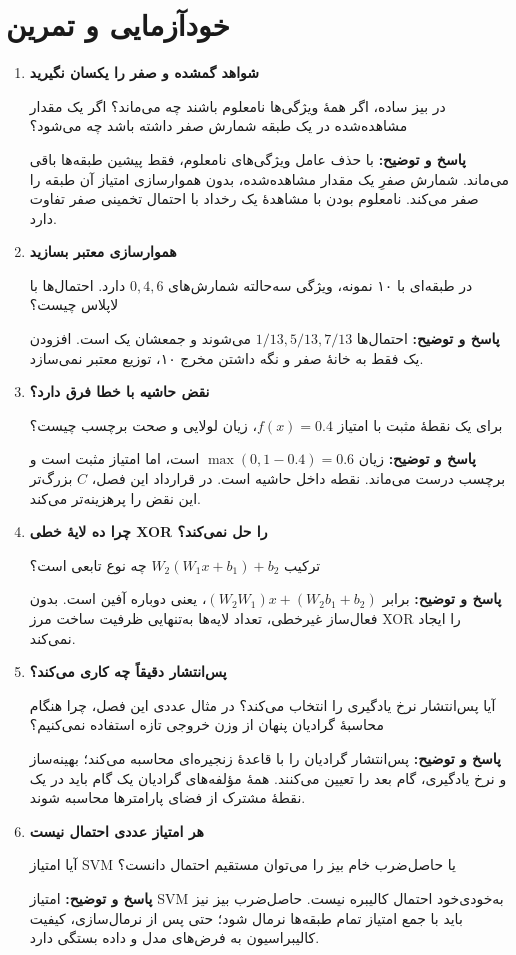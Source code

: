 \documentclass[12pt,a4paper,oneside]{report}
\newcounter{ex}[chapter]
\newenvironment{selftests}{\begin{enumerate}\setlength{\itemsep}{9pt}}{\end{enumerate}}
\newenvironment{selftest}[1]{\item\textbf{#1}\par}{\par}
\newcommand{\answer}[1]{\par{\color{teal}\bfseries پاسخ و توضیح: }#1\par}
\begin{document}
\section{خودآزمایی و تمرین}
\begin{selftests}
\begin{selftest}{شواهد گمشده و صفر را یکسان نگیرید}
در بیز ساده، اگر همهٔ ویژگی‌ها نامعلوم باشند چه می‌ماند؟ اگر یک مقدار مشاهده‌شده در یک طبقه شمارش صفر داشته باشد چه می‌شود؟
\answer{با حذف عامل ویژگی‌های نامعلوم، فقط پیشین طبقه‌ها باقی می‌ماند. شمارش صفرِ یک مقدار مشاهده‌شده، بدون هموارسازی امتیاز آن طبقه را صفر می‌کند. نامعلوم بودن با مشاهدهٔ یک رخداد با احتمال تخمینی صفر تفاوت دارد.}
\end{selftest}
\begin{selftest}{هموارسازی معتبر بسازید}
در طبقه‌ای با ۱۰ نمونه، ویژگی سه‌حالته شمارش‌های $0,4,6$ دارد. احتمال‌ها با لاپلاس چیست؟
\answer{احتمال‌ها $1/13,5/13,7/13$ می‌شوند و جمعشان یک است. افزودن یک فقط به خانهٔ صفر و نگه داشتن مخرج ۱۰، توزیع معتبر نمی‌سازد.}
\end{selftest}
\begin{selftest}{نقض حاشیه با خطا فرق دارد؟}
برای یک نقطهٔ مثبت با امتیاز $f(x)=0.4$، زیان لولایی و صحت برچسب چیست؟
\answer{زیان $\max(0,1-0.4)=0.6$ است، اما امتیاز مثبت است و برچسب درست می‌ماند. نقطه داخل حاشیه است. در قرارداد این فصل، $C$ بزرگ‌تر این نقض را پرهزینه‌تر می‌کند.}
\end{selftest}
\begin{selftest}{چرا ده لایهٔ خطی XOR را حل نمی‌کند؟}
ترکیب $W_2(W_1x+b_1)+b_2$ چه نوع تابعی است؟
\answer{برابر $(W_2W_1)x+(W_2b_1+b_2)$، یعنی دوباره آفین است. بدون فعال‌ساز غیرخطی، تعداد لایه‌ها به‌تنهایی ظرفیت ساخت مرز XOR را ایجاد نمی‌کند.}
\end{selftest}
\begin{selftest}{پس‌انتشار دقیقاً چه کاری می‌کند؟}
آیا پس‌انتشار نرخ یادگیری را انتخاب می‌کند؟ در مثال عددی این فصل، چرا هنگام محاسبهٔ گرادیان پنهان از وزن خروجی تازه استفاده نمی‌کنیم؟
\answer{پس‌انتشار گرادیان را با قاعدهٔ زنجیره‌ای محاسبه می‌کند؛ بهینه‌ساز و نرخ یادگیری، گام بعد را تعیین می‌کنند. همهٔ مؤلفه‌های گرادیان یک گام باید در یک نقطهٔ مشترک از فضای پارامترها محاسبه شوند.}
\end{selftest}
\begin{selftest}{هر امتیاز عددی احتمال نیست}
آیا امتیاز SVM یا حاصل‌ضرب خام بیز را می‌توان مستقیم احتمال دانست؟
\answer{امتیاز SVM به‌خودی‌خود احتمال کالیبره نیست. حاصل‌ضرب بیز نیز باید با جمع امتیاز تمام طبقه‌ها نرمال شود؛ حتی پس از نرمال‌سازی، کیفیت کالیبراسیون به فرض‌های مدل و داده بستگی دارد.}
\end{selftest}
\end{selftests}

\end{document}
